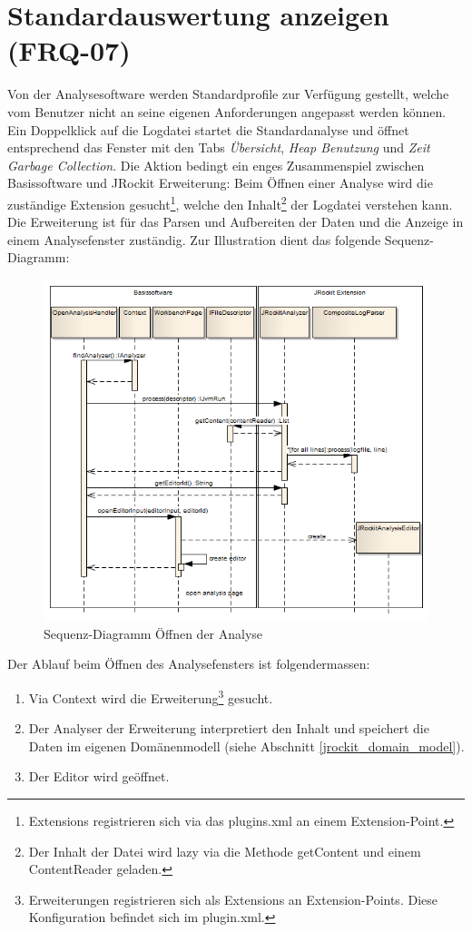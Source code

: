 \section{Standardauswertung anzeigen (FRQ-07)}
Von der Analysesoftware werden Standardprofile zur Verfügung gestellt, welche vom Benutzer nicht an seine eigenen Anforderungen angepasst werden können. Ein Doppelklick auf die Logdatei startet die Standardanalyse und öffnet entsprechend das Fenster mit den Tabs \textit{Übersicht}, \textit{Heap Benutzung} und \textit{Zeit Garbage Collection}. Die Aktion bedingt ein enges Zusammenspiel zwischen Basissoftware und JRockit Erweiterung: Beim Öffnen einer Analyse wird die zuständige Extension gesucht\footnote{Extensions registrieren sich via das plugins.xml an einem Extension-Point. }, welche den Inhalt\footnote{Der Inhalt der Datei wird lazy via die Methode getContent und einem ContentReader geladen.} der Logdatei verstehen kann. Die Erweiterung ist für das Parsen und Aufbereiten der Daten und die Anzeige in einem Analysefenster zuständig. Zur Illustration dient das folgende Sequenz-Diagramm:
 \begin{figure}[H]
  	\centering
    	\includegraphics[width=16cm]{images/core_sequence_analysis}
	\caption{Sequenz-Diagramm Öffnen der Analyse}
\end{figure}
Der Ablauf beim Öffnen des Analysefensters ist folgendermassen:
\begin{enumerate}
	\item Via Context wird die Erweiterung\footnote{Erweiterungen registrieren sich als Extensions an Extension-Points. Diese Konfiguration befindet sich im plugin.xml.} gesucht.
	\item Der Analyser der Erweiterung interpretiert den Inhalt und speichert die Daten im eigenen Domänenmodell (siehe Abschnitt \ref{jrockit_domain_model}).
	\item Der Editor wird geöffnet.
\end{enumerate}

